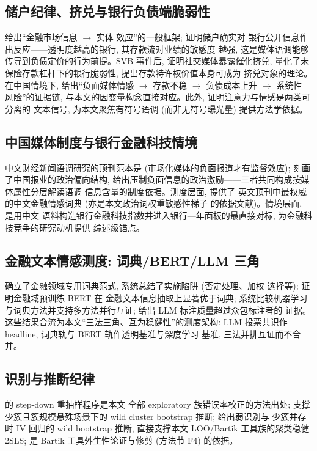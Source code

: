 \subsection{储户纪律、挤兑与银行负债端脆弱性}
\textcite{goldstein2023information} 给出``金融市场信息 $\to$ 实体
效应''的一般框架; \textcite{chen2022transparency} 证明储户确实对
银行公开信息作出反应——透明度越高的银行, 其存款流对业绩的敏感度
越强, 这是媒体语调能够传导到负债定价的行为前提。SVB 事件后,
\textcite{cookson2026runcatalyst} 证明社交媒体暴露催化挤兑,
\textcite{jiang2024fragility} 量化了未保险存款杠杆下的银行脆弱性,
\textcite{drechsler2026franchise} 提出存款特许权价值本身可成为
挤兑对象的理论。在中国情境下, \textcite{fang2024mediadeposit}
给出``负面媒体情感 $\to$ 存款不稳 $\to$ 负债成本上升 $\to$ 系统性
风险''的证据链, 与本文的因变量构念直接对应。此外,
\textcite{cookson2024socialsignal} 证明注意力与情感是两类可分离的
文本信号, 为本文聚焦有符号语调 (而非无符号曝光量) 提供方法学依据。

\subsection{中国媒体制度与银行金融科技情境}
中文财经新闻语调研究的顶刊范本是 \textcite{you2018pen}
(市场化媒体的负面报道才有监督效应); \textcite{qin2018mediabias}
刻画了中国报业的政治偏向结构, \textcite{piotroski2015political}
给出压制负面信息的政治激励——三者共同构成按媒体属性分层解读语调
信息含量的制度依据。测度层面, \textcite{du2022dictionary} 提供了
英文顶刊中最权威的中文金融情感词典 (亦是本文政治词权重敏感性梯子
的依据文献)。情境层面, \textcite{cheng2020bankfintech} 是用中文
语料构造银行金融科技指数并进入银行—年面板的最直接对标,
\textcite{berg2022fintechlending} 为金融科技竞争的研究动机提供
综述级锚点。

\subsection{金融文本情感测度: 词典/BERT/LLM 三角}
\textcite{loughran2011liability} 确立了金融领域专用词典范式,
\textcite{loughran2016survey} 系统总结了实施陷阱 (否定处理、加权
选择等); \textcite{huang2023finbert} 证明金融域预训练 BERT 在
金融文本信息抽取上显著优于词典; \textcite{frankel2022disclosure}
系统比较机器学习与词典方法并支持多方法并行互证;
\textcite{gilardi2023chatgpt} 给出 LLM 标注质量超过众包标注者的
证据。这些结果合流为本文``三法三角、互为稳健性''的测度架构:
LLM 投票共识作 headline, 词典轨与 BERT 轨作透明基准与深度学习
基准, 三法并排互证而不合并。

\subsection{识别与推断纪律}
\textcite{romanowolf2005stepwise} 的 step-down 重抽样程序是本文
全部 exploratory 族错误率校正的方法出处;
\textcite{mackinnon2017wild} 支撑少簇且簇规模悬殊场景下的 wild
cluster bootstrap 推断; \textcite{wang2024wildiv} 给出弱识别与
少簇并存时 IV 回归的 wild bootstrap 推断, 直接支撑本文
LOO/Bartik 工具族的聚类稳健 2SLS; \textcite{goldsmith2020bartik}
是 Bartik 工具外生性论证与修剪 (方法节 F4) 的依据。

